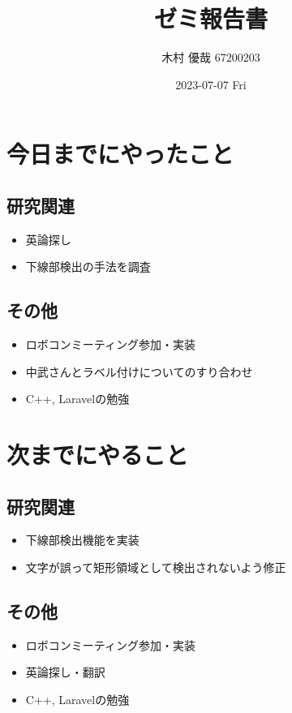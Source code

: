 \documentclass[uplatex, onecolumn, 10pt]{jsarticle}
\begin{document}
\title{\vspace{-40mm}\bf{\LARGE{ゼミ報告書}}}
\author{\vspace{-40mm}木村 優哉 67200203}
\date{2023-07-07 Fri}
\maketitle


\section{今日までにやったこと}

\subsection*{研究関連}
\begin{itemize}
	\item 英論探し
	\item 下線部検出の手法を調査
\end{itemize}

\subsection*{その他}
\begin{itemize}
	\item ロボコンミーティング参加・実装
	\item 中武さんとラベル付けについてのすり合わせ
	\item C++, Laravelの勉強
\end{itemize}


\section{次までにやること}

\subsection*{研究関連}
\begin{itemize}
	\item 下線部検出機能を実装
	\item 文字が誤って矩形領域として検出されないよう修正
\end{itemize}

\subsection*{その他}
\begin{itemize}
	\item ロボコンミーティング参加・実装
	\item 英論探し・翻訳
	\item C++, Laravelの勉強
\end{itemize}
\end{document}
